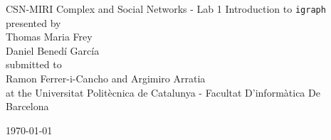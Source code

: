 \documentclass[11pt,titlepage,oneside,openany]{report}
\begin{document}
\begin{titlepage}
	\vspace*{2cm}
  \begin{center}
  \vspace{2cm} 
    {\Large CSN-MIRI Complex and Social Networks - Lab 1 Introduction to \verb|igraph|\\}
   \vspace{2cm}
   {presented by\\
    Thomas Maria Frey \\
    Daniel Benedí García\\
   } \vspace{2cm}
    {submitted to\\
     Ramon Ferrer-i-Cancho and Argimiro Arratia \\
     at the Universitat Politècnica de Catalunya - Facultat D'informàtica De Barcelona\\
     } \vspace{2cm}
   
   {\monthyeardate\today}
  \end{center}
\end{titlepage} 






\end{document}
